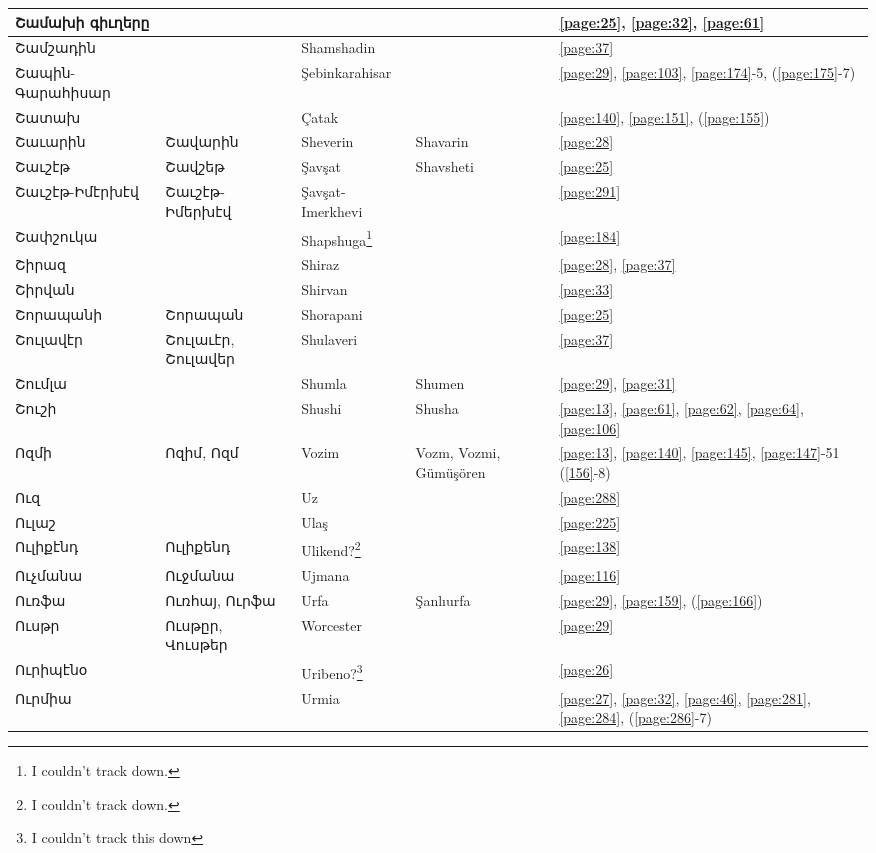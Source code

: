 \begin{center}
\begin{longtable}{|p{}|p{3cm}|p{3cm}|p{2cm}|p{3cm}|}
Շամախի գիւղերը& & & &\ref{page:25}, \ref{page:32}, \ref{page:61}\\ \hline
Շամշադին& &Shamshadin & &\ref{page:37}\\ \hline
Շապին-Գարահիսար& & Şebinkarahisar& &\ref{page:29}, \ref{page:103}, \ref{page:174}-5, (\ref{page:175}-7)\\ \hline
Շատախ& & Çatak& &\ref{page:140}, \ref{page:151}, (\ref{page:155})\\ \hline
Շաւարին& Շավարին&  Sheverin &Shavarin &\ref{page:28}\\ \hline
Շաւշէթ&Շավշեթ &Şavşat &Shavsheti &\ref{page:25}\\ \hline
Շաւշէթ-Իմէրխէվ&Շաւշէթ-Իմերխէվ & Şavşat-Imerkhevi& &\ref{page:291}\\ \hline
Շափշուկա& & Shapshuga\footnote{I couldn't track down.}& &\ref{page:184}\\ \hline
Շիրազ& &Shiraz & &\ref{page:28}, \ref{page:37}\\ \hline
Շիրվան& &Shirvan & &\ref{page:33}\\ \hline
Շորապանի&Շորապան & Shorapani& &\ref{page:25}\\ \hline
Շուլավէր&Շուլաւէր, Շուլավեր &Shulaveri & &   \ref{page:37}\\ \hline
Շումլա& &Shumla & Shumen& \ref{page:29}, \ref{page:31} \\ \hline
Շուշի& & Shushi&Shusha &\ref{page:13}, \ref{page:61}, \ref{page:62}, \ref{page:64}, \ref{page:106} \\\hline
Ոզմի& Ոզիմ, Ոզմ& Vozim&Vozm, Vozmi, Gümüşören & \ref{page:13}, \ref{page:140}, \ref{page:145}, \ref{page:147}-51 (\ref{156}-8) \\ \hline 
Ուզ & &Uz & &    \ref{page:288}\\ \hline
Ուլաշ& &Ulaş & &\ref{page:225}\\ \hline
Ուլիքէնդ&Ուլիքենդ & Ulikend?\footnote{I couldn't track down.}& &\ref{page:138}\\ \hline
Ուչմանա& Ուջմանա&Ujmana & &\ref{page:116}\\ \hline
Ուռֆա&   Ուռհայ, Ուրֆա & Urfa&Şanlıurfa &\ref{page:29}, \ref{page:159}, (\ref{page:166})\\ \hline
Ուսթր& Ուսթըր, Վուսթեր &Worcester & &\ref{page:29}\\ \hline
Ուրիպէնօ& &Uribeno?\footnote{I couldn't track this down} & &\ref{page:26}\\ \hline
Ուրմիա& &Urmia & &\ref{page:27}, \ref{page:32}, \ref{page:46}, \ref{page:281}, \ref{page:284}, (\ref{page:286}-7)\\ \hline

\end{longtable}
\end{center}
